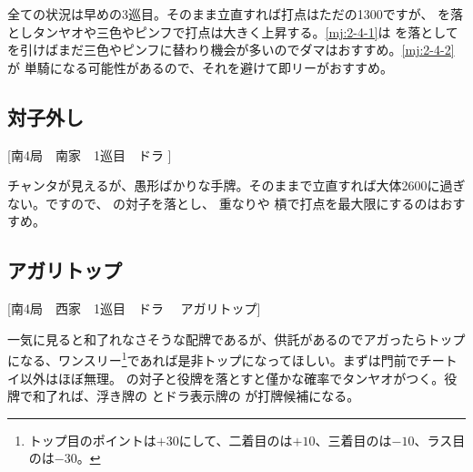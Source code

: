 \documentclass[../nankiru_main.tex]{subfiles}
\begin{document}
全ての状況は早めの3巡目。そのまま立直すれば打点はただの1300ですが、 を落としタンヤオや三色やピンフで打点は大きく上昇する。\ref{mj:2-4-1}は を落として  を引けばまだ三色やピンフに替わり機会が多いのでダマはおすすめ。\ref{mj:2-4-2}が  単騎になる可能性があるので、それを避けて即リーがおすすめ\citep[][pp. 68--73]{tetsusenryaku}。

\subsection{対子外し}

[南4局　南家　1巡目　ドラ ]

チャンタが見えるが、愚形ばかりな手牌。そのままで立直すれば大体2600に過ぎない。ですので、 の対子を落とし、 重なりや  槓で打点を最大限にするのはおすすめ\citep[][pp. 74--79]{tetsusenryaku}。

\subsection{アガリトップ}

[南4局　西家　1巡目　ドラ 　アガリトップ]

一気に見ると和了れなさそうな配牌であるが、供託があるのでアガったらトップになる、ワンスリー\footnote{トップ目のポイントは$+30$にして、二着目のは$+10$、三着目のは$-10$、ラス目のは$-30$。}であれば是非トップになってほしい。まずは門前でチートイ以外はほぼ無理。 の対子と役牌を落とすと僅かな確率でタンヤオがつく。役牌で和了れば、浮き牌の  とドラ表示牌の  が打牌候補になる\citep[][pp. 114--119]{tetsusenryaku}。
\end{document}
